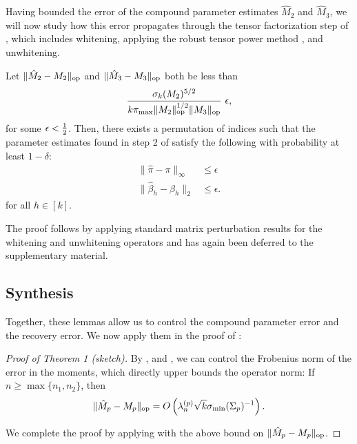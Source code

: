 Having bounded the error of the compound parameter estimates $\hat M_2$ and $\hat M_3$,
we will now study how this error propagates through the tensor factorization step of 
,
which includes whitening, applying the robust tensor power method \cite{AnandkumarGeHsu2012},
and unwhitening.
\begin{lemma}
  \label{lem:tensorPower} Let $\|\hat M_2 - M_2\|_{\text{\rm op}}$ and $\|\hat M_3 - M_3\|_{\text{\rm op}}$ both be less than
  \vspace{-0.5em}
  $$\frac{\sigma_k(M_2)^{5/2}}{k \pi_{\max} \|M_2\|_{\text{\rm op}}^{1/2} \| {M_3} \|_{\text{\rm op}}}~ \epsilon,$$
  for some $\epsilon < \frac{1}{2}$. 
  Then, there exists a permutation of indices such that  the parameter
  estimates found in step 2 of 
  satisfy the following with probability at least $1 - \delta$:
  \begin{align*}
  \|\hat \pi - \pi \|_{\infty} &\le \epsilon \\
  \|\hat \beta_h - \beta_h\|_2 &\le \epsilon.
  \end{align*}
  for all $h \in [k]$.
\end{lemma}

The proof follows by applying standard matrix perturbation results for
the whitening and unwhitening operators and has again been deferred
to the supplementary material.

\subsection{Synthesis}
Together, these lemmas allow us to control the compound parameter error
and the recovery error. We now apply them in the proof of
:

\begin{proof}[Proof of Theorem 1 (sketch)]
By ,  and , we
can control the Frobenius norm of the error in the moments, which
directly upper bounds the operator norm: If $n \ge \max\{n_1, n_2\}$,
then
\begin{align}
  \|\hat M_p - M_p\|_{\text{\rm op}} = O\left( \lambda_n^{(p)} \sqrt{k} \sigma_\text{\rm min}(\Sigma_p)^{-1} \right).
\end{align}

We complete the proof by applying  with the above
bound on $\|\hat M_p - M_p\|_{\text{\rm op}}$.

\end{proof}

